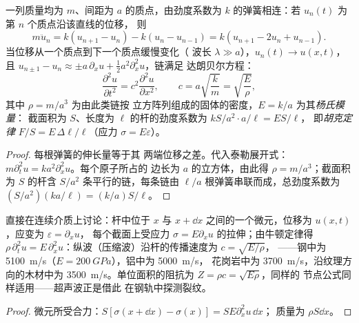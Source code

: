 \begin{proposition}\label{prop:b2:waves-on-strings:chain}
一列质量均为 $m$、间距为 $a$ 的质点，由劲度系数为
$k$ 的弹簧相连：若 $u_n(t)$ 为第 $n$ 个质点沿该直线的位移，
则
\[
m\ddot u_n = k(u_{n+1} - u_n) - k(u_n - u_{n-1}) = k(u_{n+1} - 2u_n + u_{n-1}) .
\]
当位移从一个质点到下一个质点缓慢变化（
波长 $\lambda \gg a$），$u_n(t) \to u(x, t)$，且 $u_{n\pm1} - u_n \approx
\pm a\,\partial_xu + \tfrac12a^2\partial_x^2u$，链满足
达朗贝尔方程：
\[
\frac{\partial^2u}{\partial t^2} = c^2\frac{\partial^2u}{\partial x^2} , \qquad
c = a\sqrt{\frac km} = \sqrt{\frac{E}{\rho}} ,
\]
其中 $\rho = m/a^3$ 为由此类链按
立方阵列组成的固体的密度，$E = k/a$ 为其\emph{杨氏模量}：
截面积为 $S$、长度为 $\ell$ 的杆的劲度系数为 $kS/a^2\cdot a/\ell = ES/\ell$，
即\emph{胡克定律} $F/S = E\,\Delta\ell/\ell$（应力 $\sigma = E\varepsilon$）。
\end{proposition}

\begin{proof}
每根弹簧的伸长量等于其
两端位移之差。代入泰勒展开式：$m\partial_t^2u = ka^2\partial_x^2u$。每个原子所占的
边长为 $a$ 的立方体，由此得 $\rho = m/a^3$；截面积为 $S$ 的杆含
$S/a^2$ 条平行的链，每条链由 $\ell/a$ 根弹簧串联而成，总劲度系数为
$(S/a^2)(ka/\ell) = (k/a)S/\ell$。
\end{proof}

\begin{proposition}[杆中的纵波]\label{prop:b2:waves-on-strings:rod}
直接在连续介质上讨论：杆中位于 $x$ 与 $x +
\dd x$ 之间的一个微元，位移为 $u(x, t)$，应变为 $\varepsilon = \partial_xu$，
每个截面上受应力 $\sigma = E\partial_xu$ 的拉伸；由牛顿定律得 $\rho\,\partial_t^2u =
E\,\partial_x^2u$：纵波（压缩波）沿杆的传播速度为 $c = \sqrt{E/\rho}$，
——钢中为 \qty{5100}{m/s}（$E = \qty{200}{GPa}$），铝中为 \qty{5000}{m/s}，
花岗岩中为 \qty{3700}{m/s}，沿纹理方向的木材中为
\qty{3500}{m/s}。单位面积的阻抗为 $Z = \rho c = \sqrt{E\rho}$，同样的
节点公式同样适用——超声波正是借此
在钢轨中探测裂纹。
\end{proposition}

\begin{proof}
微元所受合力：$S[\sigma(x + \dd x) - \sigma(x)] = SE\partial_x^2u\,\dd x$；
质量为 $\rho S\dd x$。
\end{proof}

